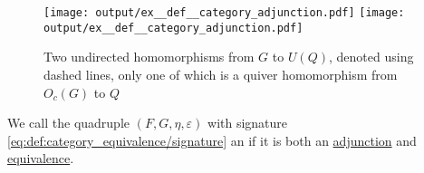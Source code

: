 \begin{example}
\begin{thmenum}
    \begin{figure}[!ht]
      \hfill
      \texttt{[image: output/ex\_\_def\_\_category\_adjunction.pdf]}
      \hfill
      \texttt{[image: output/ex\_\_def\_\_category\_adjunction.pdf]}
      \hfill\hfill
      \caption{Two undirected homomorphisms from \( G \) to \( U(Q) \), denoted using dashed lines, only one of which is a quiver homomorphism from \( O_c(G) \) to \( Q \)}
      \label{fig:ex:def:category_adjunction/multgph_quiv}
    \end{figure}
  \end{thmenum}
\end{example}

\begin{definition}\label{def:adjoint_equivalence}
  We call the quadruple \( (F, G, \eta, \varepsilon) \) with signature \eqref{eq:def:category_equivalence/signature} an  if it is both an \hyperref[def:category_adjunction]{adjunction} and \hyperref[def:category_equivalence]{equivalence}.
\end{definition}

